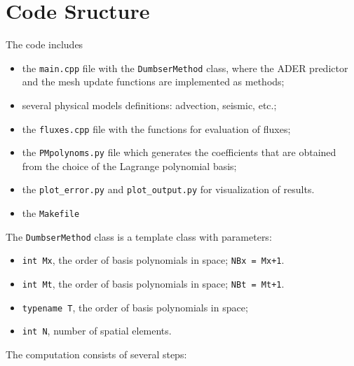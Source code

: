 \documentclass[a5paper]{article}
\begin{document}
\section{Code Sructure}\label{sec:algorithm}
The code includes 
\begin{itemize}
  \item the \lstinline{main.cpp} file with  the \lstinline{DumbserMethod} class, where the ADER predictor and the mesh update functions are implemented as methods;
  \item several physical models definitions: advection, seismic, etc.;
  \item the \lstinline{fluxes.cpp} file with the functions for evaluation of fluxes;
  \item the \lstinline{PMpolynoms.py} file which generates the coefficients that are obtained from the choice of the Lagrange polynomial basis;
  \item the \lstinline{plot_error.py} and \lstinline{plot_output.py} for visualization of results. 
  \item the \lstinline{Makefile}
\end{itemize}

The  \lstinline{DumbserMethod} class is a template class with parameters:
\begin{itemize}
  \item \lstinline{int Mx}, the order of basis polynomials in space; \lstinline{NBx = Mx+1}. 
  \item \lstinline{int Mt}, the order of basis polynomials in space; \lstinline{NBt = Mt+1}.
  \item \lstinline{typename T}, the order of basis polynomials in space;
  \item \lstinline{int N}, number of spatial elements.
\end{itemize}

\clearpage
The computation consists of several steps:
\end{document}
